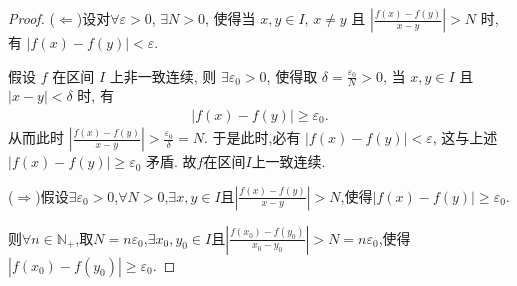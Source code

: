 \documentclass[lang=cn,newtx,10pt,scheme=chinese]{elegantbook}
\begin{document}
\begin{proof}
        ($\Leftarrow $)设对\(\forall \varepsilon >0\), \(\exists N>0\), 使得当 \(x,y\in I\), \(x\neq y\) 且 \(\left| \frac{f\left( x \right) -f\left( y \right)}{x-y} \right|>N\) 时, 有 \(\left| f\left( x \right) -f\left( y \right) \right|<\varepsilon\).

        假设 \(f\) 在区间 \(I\) 上非一致连续,
        则 \(\exists \varepsilon _0>0\), 使得取 \(\delta =\frac{\varepsilon _0}{N}>0\), 当 \(x,y\in I\) 且 \(\left| x-y \right|<\delta\) 时, 有
         \begin{align*}
            \left| f\left( x \right) -f\left( y \right) \right|\geqslant \varepsilon _0.
         \end{align*}
        从而此时 \(\left| \frac{f\left( x \right) -f\left( y \right)}{x-y} \right|>\frac{\varepsilon _0}{\delta}=N\).
        于是此时,必有 \(\left| f\left( x \right) -f\left( y \right) \right|<\varepsilon\), 这与上述 \(\left| f\left( x \right) -f\left( y \right) \right|\geqslant \varepsilon _0\) 矛盾. 故\(f\)在区间\(I\)上一致连续.

        ($\Rightarrow $)假设\(\exists \varepsilon _0>0\),\(\forall N>0\),\(\exists x,y\in I\)且\(\left| \frac{f\left( x \right) -f\left( y \right)}{x-y} \right|>N\),使得\(\left| f\left( x \right) -f\left( y \right) \right|\geq \varepsilon _0\).
        
        则\(\forall n\in \mathbb{N} _+\),取\(N = n\varepsilon _0\),\(\exists x_0,y_0\in I\)且\(\left| \frac{f\left( x_0 \right) -f\left( y_0 \right)}{x_0-y_0} \right|>N = n\varepsilon _0\),使得\(\left| f\left( x_0 \right) -f\left( y_0 \right) \right|\geq \varepsilon _0\).


\end{proof}
\end{document}
